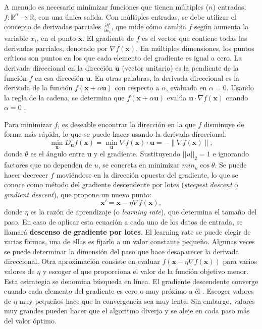 A menudo es necesario minimizar funciones que tienen múltiples ($n$) entradas: $f : \mathbb{R}^n \to \mathbb{R}$, con una única salida. Con múltiples entradas, se debe utilizar el concepto de derivadas parciales $\frac{\partial f}{\partial x_i}$, que mide cómo cambia $f$ según aumenta la variable $x_i$, en el punto $\mathbf{x}$. El gradiente de $f$ es el vector que contiene todas las derivadas parciales, denotado por $\nabla f(\mathbf{x})$. En múltiples dimensiones, los puntos críticos son puntos en los que cada elemento del gradiente es igual a cero. La derivada direccional en la dirección $\mathbf{u}$ (vector unitario) es la pendiente de la función $f$ en esa dirección $\mathbf{u}$. En otras palabras, la derivada direccional es la derivada de la función $f(\mathbf{x} + \alpha \mathbf{u})$ con respecto a $\alpha$, evaluada en $\alpha = 0$. Usando la regla de la cadena, se determina que $f(\mathbf{x} + \alpha \mathbf{u})$ evalúa $\mathbf{u} \cdot \nabla f(\mathbf{x})$ cuando $\alpha = 0$ \citep{pajares2021aprendizaje}.

Para minimizar $f$, es deseable encontrar la dirección en la que $f$ disminuye de forma más rápida, lo que se puede hacer usando la derivada direccional:
\begin{equation}
    \min_{\mathbf{u}} D_{\mathbf{u}} f(\mathbf{x}) = \min_{\mathbf{u}} \nabla f(\mathbf{x}) \cdot \mathbf{u} = - \|\nabla f(\mathbf{x})\|,
\end{equation}
donde $\theta$ es el ángulo entre $\mathbf{u}$ y el gradiente. Sustituyendo $||u||_2 = 1$ e ignorando factores que no dependen de $u$, se concreta en minimizar $min_u \cos \theta$. Se puede hacer decrecer $f$ moviéndose en la dirección opuesta del gradiente, lo que se conoce como método del gradiente descendente por lotes (\textit{steepest descent} o \textit{gradient descent}), que propone un nuevo punto:
\begin{equation}
    \mathbf{x}' = \mathbf{x} - \eta \nabla f(\mathbf{x}),
\end{equation}
donde $\eta$ es la razón de aprendizaje (o \textit{learning rate}), que determina el tamaño del paso. En caso de aplicar esta ecuación a cada uno de los datos de entrada, se llamará \textbf{descenso de gradiente por lotes}. El learning rate se puede elegir de varias formas, una de ellas es fijarlo a un valor constante pequeño. Algunas veces se puede determinar la dimensión del paso que hace desaparecer la derivada direccional. Otra aproximación consiste en evaluar $f(\mathbf{x} - \eta \nabla f(\mathbf{x}))$ para varios valores de $\eta$ y escoger el que proporciona el valor de la función objetivo menor. Esta estrategia se denomina búsqueda en línea. El gradiente descendente converge cuando cada elemento del gradiente es cero o muy próximo a él \citep{pajares2021aprendizaje}.  Escoger valores de $\eta$ muy pequeños hace que la convergencia sea muy lenta. Sin embargo, valores muy grandes pueden hacer que el algoritmo diverja y se aleje en cada paso más del valor óptimo.

